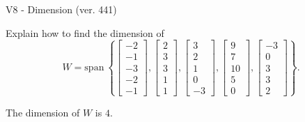 \begin{exercise}
  \begin{exerciseTitle}V8 - Dimension (ver. 441)\end{exerciseTitle}
  \begin{exerciseStatement}
    Explain how to find the dimension of 
\[W=\mathrm{span}\ \left\{\left[\begin{array}{r}
-2 \\
-1 \\
-3 \\
-2 \\
-1
\end{array}\right] , \left[\begin{array}{r}
2 \\
3 \\
3 \\
1 \\
1
\end{array}\right] , \left[\begin{array}{r}
3 \\
2 \\
1 \\
0 \\
-3
\end{array}\right] , \left[\begin{array}{r}
9 \\
7 \\
10 \\
5 \\
0
\end{array}\right] , \left[\begin{array}{r}
-3 \\
0 \\
3 \\
3 \\
2
\end{array}\right]\right\}.\]



  \end{exerciseStatement}
  \begin{exerciseAnswer}
   The dimension of \(W\) is  \(4\).
  


  \end{exerciseAnswer}
\end{exercise}